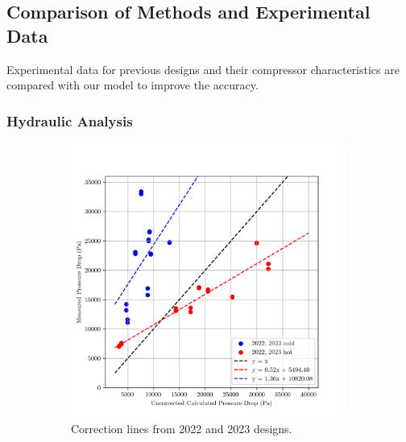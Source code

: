 \documentclass{article}
\begin{document}
\subsection{Comparison of Methods and Experimental Data}

Experimental data for previous designs and their compressor characteristics are compared with our model to improve the accuracy.

\subsubsection{Hydraulic Analysis}

\begin{figure}[H]
  \centering
  \begin{subfigure}{.49\textwidth}
    \centering
    \includegraphics[width=0.99\textwidth]{dp_ucalc_vs_meas.png}
    \caption{Correction lines from 2022 and 2023 designs.}
    \label{fig:uncorrected_pressure_drops}
  \end{subfigure}
  \begin{subfigure}{.49\textwidth}
    \centering

\end{subfigure}
\end{figure}
\end{document}
